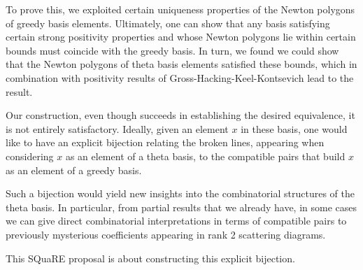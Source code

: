 \documentclass{amsart}
\begin{document}
    To prove this, we exploited certain uniqueness properties of the Newton
    polygons of greedy basis elements.  Ultimately, one can show that any basis
    satisfying certain strong positivity properties and whose Newton polygons
    lie within certain bounds must coincide with the greedy basis.  In turn, we
    found we could show that the Newton polygons of theta basis elements
    satisfied these bounds, which in combination with positivity results of
    Gross-Hacking-Keel-Kontsevich lead to the result. 
    
    Our construction, even though succeeds in establishing the desired
    equivalence, it is not entirely satisfactory. Ideally, given an element $x$
    in these basis, one would like to have an explicit bijection relating the 
    broken lines, appearing when considering $x$ as an element of a theta basis,
    to the compatible pairs that build $x$ as an element of a greedy basis.

    Such a bijection would yield new insights into the combinatorial structures
    of the theta basis. In particular, from partial results that we already
    have, in some cases we can give direct combinatorial interpretations in
    terms of compatible pairs to previously mysterious coefficients appearing in
    rank 2 scattering diagrams.
    
    This SQuaRE proposal is about constructing this explicit bijection.
\end{document}

